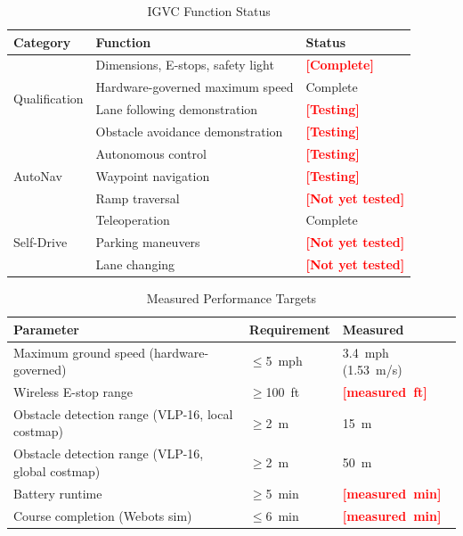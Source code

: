\documentclass[11pt, letterpaper]{article}
\newcommand{\placeholder}[1]{\textcolor{red}{\textbf{[#1]}}}
\begin{document}
\begin{table}[H]
    \centering
    \small
    \caption{IGVC Function Status}
    \label{tab:perf}
    \begin{tabularx}{\textwidth}{l X l}
        \toprule
        \textbf{Category} & \textbf{Function} & \textbf{Status} \\
        \midrule
        \multirow{4}{*}{Qualification} & Dimensions, E-stops, safety light & \placeholder{Complete} \\
        & Hardware-governed maximum speed & Complete \\
        & Lane following demonstration & \placeholder{Testing} \\
        & Obstacle avoidance demonstration & \placeholder{Testing} \\
        \midrule
        \multirow{3}{*}{AutoNav} & Autonomous control & \placeholder{Testing} \\
        & Waypoint navigation & \placeholder{Testing} \\
        & Ramp traversal & \placeholder{Not yet tested} \\
        \midrule
        \multirow{3}{*}{Self-Drive} & Teleoperation & Complete \\
        & Parking maneuvers & \placeholder{Not yet tested} \\
        & Lane changing & \placeholder{Not yet tested} \\
        \bottomrule
    \end{tabularx}
\end{table}

\begin{table}[H]
    \centering
    \small
    \caption{Measured Performance Targets}
    \begin{tabularx}{\textwidth}{X l l}
        \toprule
        \textbf{Parameter} & \textbf{Requirement} & \textbf{Measured} \\
        \midrule
        Maximum ground speed (hardware-governed) & $\le$5~mph & 3.4~mph (1.53~m/s) \\
        Wireless E-stop range & $\ge$100~ft & \placeholder{measured~ft} \\
        Obstacle detection range (VLP-16, local costmap) & $\ge$2~m & 15~m \\
        Obstacle detection range (VLP-16, global costmap) & $\ge$2~m & 50~m \\
        Battery runtime & $\ge$5~min & \placeholder{measured~min} \\
        Course completion (Webots sim) & $\le$6~min & \placeholder{measured~min} \\
        \bottomrule
    \end{tabularx}
\end{table}
\end{document}
